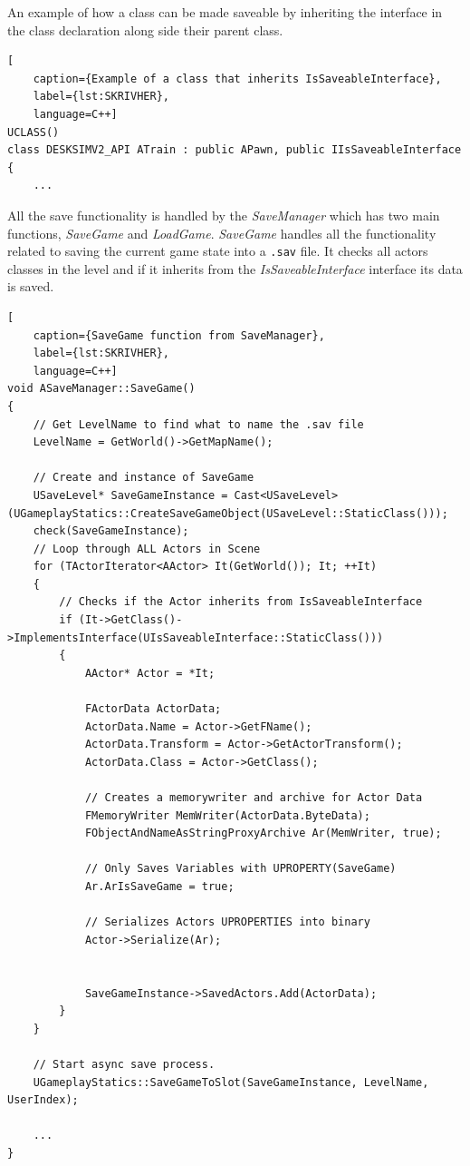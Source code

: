 An example of how a class can be made saveable by inheriting the interface in the class declaration along side their parent class.

\begin{lstlisting}[
    caption={Example of a class that inherits IsSaveableInterface},
    label={lst:SKRIVHER},
    language=C++]
UCLASS()
class DESKSIMV2_API ATrain : public APawn, public IIsSaveableInterface
{
	...
\end{lstlisting}

All the save functionality is handled by the \textit{SaveManager} which has two main functions, \textit{SaveGame} and \textit{LoadGame}. \textit{SaveGame} handles all the functionality related to saving the current game state into a \verb|.sav| file. It checks all actors classes in the level and if it inherits from the \textit{IsSaveableInterface} interface its data is saved. 

\begin{lstlisting}[
    caption={SaveGame function from SaveManager},
    label={lst:SKRIVHER},
    language=C++]
void ASaveManager::SaveGame()
{
	// Get LevelName to find what to name the .sav file
	LevelName = GetWorld()->GetMapName();

	// Create and instance of SaveGame
	USaveLevel* SaveGameInstance = Cast<USaveLevel>(UGameplayStatics::CreateSaveGameObject(USaveLevel::StaticClass()));
	check(SaveGameInstance);
	// Loop through ALL Actors in Scene
	for (TActorIterator<AActor> It(GetWorld()); It; ++It)
	{
		// Checks if the Actor inherits from IsSaveableInterface
		if (It->GetClass()->ImplementsInterface(UIsSaveableInterface::StaticClass())) 
		{
			AActor* Actor = *It;

			FActorData ActorData;
			ActorData.Name = Actor->GetFName();
			ActorData.Transform = Actor->GetActorTransform();
			ActorData.Class = Actor->GetClass();

			// Creates a memorywriter and archive for Actor Data
			FMemoryWriter MemWriter(ActorData.ByteData);
			FObjectAndNameAsStringProxyArchive Ar(MemWriter, true);
				
			// Only Saves Variables with UPROPERTY(SaveGame)
			Ar.ArIsSaveGame = true;
				
			// Serializes Actors UPROPERTIES into binary
			Actor->Serialize(Ar);
				

			SaveGameInstance->SavedActors.Add(ActorData);
		}
	}

	// Start async save process.
	UGameplayStatics::SaveGameToSlot(SaveGameInstance, LevelName, UserIndex);

	...
}
\end{lstlisting}

